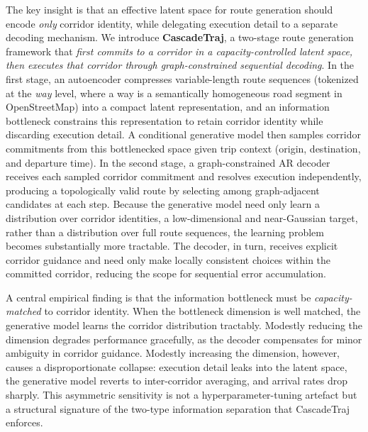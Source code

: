 The key insight is that an effective latent space for route generation should encode \emph{only} corridor identity, while delegating execution detail to a separate decoding mechanism.
We introduce \textbf{CascadeTraj}, a two-stage route generation framework that \emph{first commits to a corridor in a capacity-controlled latent space, then executes that corridor through graph-constrained sequential decoding}.
In the first stage, an autoencoder compresses variable-length route sequences (tokenized at the \emph{way} level, where a way is a semantically homogeneous road segment in OpenStreetMap) into a compact latent representation, and an information bottleneck constrains this representation to retain corridor identity while discarding execution detail.
A conditional generative model then samples corridor commitments from this bottlenecked space given trip context (origin, destination, and departure time).
In the second stage, a graph-constrained AR decoder receives each sampled corridor commitment and resolves execution independently, producing a topologically valid route by selecting among graph-adjacent candidates at each step.
Because the generative model need only learn a distribution over corridor identities, a low-dimensional and near-Gaussian target, rather than a distribution over full route sequences, the learning problem becomes substantially more tractable.
The decoder, in turn, receives explicit corridor guidance and need only make locally consistent choices within the committed corridor, reducing the scope for sequential error accumulation.

A central empirical finding is that the information bottleneck must be \emph{capacity-matched} to corridor identity.
When the bottleneck dimension is well matched, the generative model learns the corridor distribution tractably.
Modestly reducing the dimension degrades performance gracefully, as the decoder compensates for minor ambiguity in corridor guidance.
Modestly increasing the dimension, however, causes a disproportionate collapse: execution detail leaks into the latent space, the generative model reverts to inter-corridor averaging, and arrival rates drop sharply.
This asymmetric sensitivity is not a hyperparameter-tuning artefact but a structural signature of the two-type information separation that CascadeTraj enforces.

